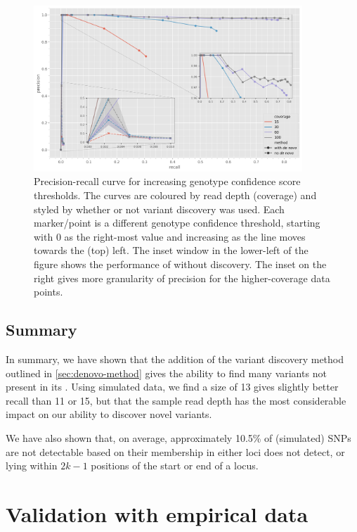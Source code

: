 \begin{figure}
    \centering
    \includegraphics[width=0.9\textwidth]{Chapter1/Figs/denovo-sims-roc.png}
    \caption{Precision-recall curve for increasing genotype confidence score thresholds. The curves are coloured by read depth (coverage) and styled by whether or not \denovo{} variant discovery was used. Each marker/point is a different genotype confidence threshold, starting with 0 as the right-most value and increasing as the line moves towards the (top) left. The inset window in the lower-left of the figure shows the performance of \pandora{} without \denovo{} discovery. The inset on the right gives more granularity of precision for the higher-coverage data points.}
    \label{fig:denovo-sims-roc}
\end{figure}

\subsection{Summary}

In summary, we have shown that the addition of the \denovo{} variant discovery method outlined in \autoref{sec:denovo-method} gives \pandora{} the ability to find many variants not present in its \panrg{}. Using simulated data, we find a \kmer{} size of 13 gives slightly better recall than 11 or 15, but that the sample read depth has the most considerable impact on our ability to discover novel variants.

We have also shown that, on average, approximately 10.5\% of (simulated) SNPs are not detectable based on their membership in either loci \pandora{} does not detect, or lying within $2k-1$ positions of the start or end of a locus.

\section{Validation with empirical data}
\label{sec:denovo-empirical}

